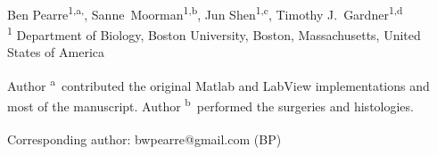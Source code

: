 \documentclass[10pt,letterpaper]{article}
\date{}
\begin{document}
\vspace*{0.35in}

\begin{flushleft}
{\Large
  \textbf{}
}
\newline
\\
Ben Pearre\textsuperscript{1,a,\textcurrency},
Sanne~Moorman\textsuperscript{1,b},
Jun Shen\textsuperscript{1,c},
Timothy J.~Gardner\textsuperscript{1,d}
\\
\bigskip
\textsuperscript{1} Department of Biology, Boston University, Boston, Massachusetts, United States of America
\\
\bigskip

% 
%
Author \textsuperscript{a}~contributed the original Matlab and LabView implementations and most of the manuscript. Author \textsuperscript{b}~performed the surgeries and histologies.





\textsuperscript{\textcurrency} Corresponding author: bwpearre@gmail.com (BP)

\end{flushleft}
\end{document}
